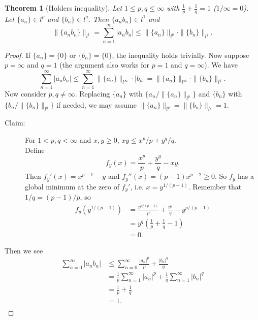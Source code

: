 \documentclass[12pt]{article}
\theoremstyle{plain}
\newtheorem{thm}{Theorem}
\theoremstyle{definition}
\begin{document}
\begin{thm}[Holders inequality]
    Let $1\leq p, q\leq \infty$ with $\frac{1}{p} + \frac{1}{q} = 1$ ($1/\infty = 0$).
    Let $\{a_n\}\in l^p$ and $\{b_n\}\in l^q$.
    Then $\{a_nb_n\}\in l^1$ and
    \[\|\{a_nb_n\}\|_{l^1} = \sum_{n=1}^\infty |a_nb_n| \leq \|\{a_n\}\|_{l^p}\cdot\|\{b_n\}\|_{l^q}.\]
\end{thm}
\begin{proof}
    If $\{a_n\} = \{0\}$  or $\{b_n\} = \{0\}$, the inequality holds trivially.
    Now suppose $p=\infty$ and $q = 1$ (the argument also works for $p=1$ and $q=\infty$).
    We have
    \[
        \sum_{n=1}^\infty |a_nb_n| \leq \sum_{n=1}^\infty \|\{a_n\}\|_{l^\infty}\cdot |b_n| =
        \|\{a_n\}\|_{l^\infty}\cdot\|\{b_n\}\|_{l^1}.
    \]
    Now consider $p,q\neq\infty$.
    Replacing $\{a_n\}$ with $\{a_n/\|\{a_n\}\|_{l^p}\}$ and $\{b_n\}$ with $\{b_n/\|\{b_n\}\|_{l^q}\}$
    if needed, we may assume $\|\{a_n\}\|_{l^p} = \|\{b_n\}\|_{l^q} = 1$.
    \begin{description}
        \item[Claim:] For $1<p,q<\infty$ and $x, y\geq 0$, $xy\leq x^p/p + y^q/q$.\\
            Define 
            \[
                f_y(x) = \frac{x^p}{p} + \frac{y^q}{q} - xy.
            \]
            Then
            $f_y'(x) = x^{p-1} - y$ and $f_y''(x) = (p-1)x^{p-2}\geq 0$.
            So $f_y$ has a global minimum at the zero of $f_y'$, i.e. $x=y^{1/(p-1)}$.
            Remember that $1/q = (p-1)/p$, so
            \[\begin{aligned}
                    f_y(y^{1/(p-1)}) &= \frac{y^{p/(p-1)}}{p} + \frac{y^q}{q} - y^{p/(p-1)}\\
                                     & = y^q\left(\frac{1}{p} + \frac{1}{q} -1\right)\\
                                     &= 0.
            \end{aligned}\]
    \end{description}
    Then we see
    \[\begin{aligned}
            \sum_{n=0}^\infty |a_nb_n| &\leq \sum_{n=0}^\infty \frac{|a_n|^p}{p} + \frac{|b_n|^q}{q}\\
                                       &=\frac{1}{p}\sum_{n=1}^\infty |a_n|^p + \frac{1}{q}\sum_{n=1}^\infty |b_n|^q\\
                                       &= \frac{1}{p} + \frac{1}{q}\\
                                       &= 1.\\
    \end{aligned}\]
\end{proof}
\end{document}
